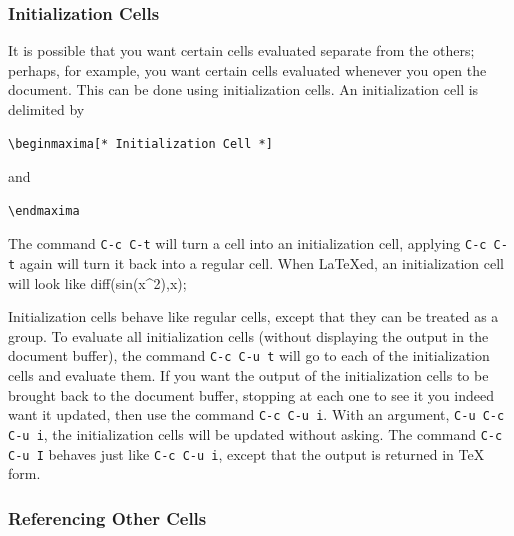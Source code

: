 \subsubsection{Initialization Cells}

\noindent
It is possible that you want certain cells evaluated separate from the
others; perhaps, for example, you want certain cells evaluated whenever
you open the document.  This can be done using initialization cells.
An initialization cell is delimited by
\begin{verbatim}
\beginmaxima[* Initialization Cell *]
\end{verbatim}
\noindent
and
\begin{verbatim}
\endmaxima
\end{verbatim}
\noindent
The command \texttt{C-c C-t} will turn a cell into
an initialization cell, applying \texttt{C-c C-t} again will turn it
back into a regular cell.  
When \LaTeX{}ed, an initialization cell will look like
diff(sin(x^2),x);
\endmaxima

Initialization cells behave like regular
cells, except that they can be treated as a group.
To evaluate all initialization cells (without displaying the output in
the document buffer), the
command \texttt{C-c C-u t} will go to each of the
initialization cells and evaluate them.
If you want the output of the initialization cells to be brought back 
to the document buffer,  stopping at each one to see it
you indeed want it updated, then use the command \texttt{C-c C-u i}.
With an argument, \texttt{C-u C-c C-u i}, the
initialization cells will be updated without asking.   The command 
\texttt{C-c C-u I} behaves just like \texttt{C-c C-u i},
except that the output is returned in \TeX{} form.

\subsubsection{Referencing Other Cells}

